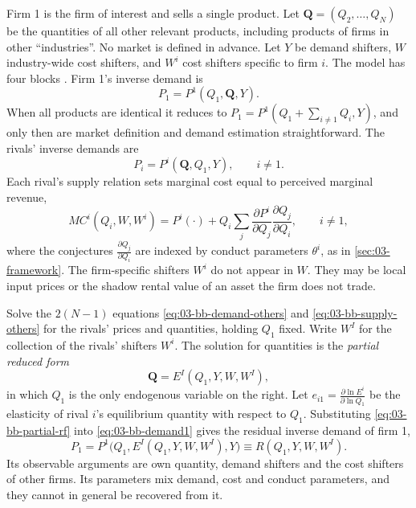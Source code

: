 Firm 1 is the firm of interest and sells a single product. Let $\mathbf{Q} = (Q_2, \dots, Q_N)$ be the
quantities of all other relevant products, including products of firms in other ``industries''. No market
is defined in advance. Let $Y$ be demand shifters, $W$ industry-wide cost shifters, and $W^i$ cost shifters
specific to firm $i$. The model has four blocks \citep[pp.~286--289]{BakerBresnahan1988}. Firm 1's inverse
demand is
\begin{equation}\label{eq:03-bb-demand1}
  P_1 = P^1(Q_1, \mathbf{Q}, Y).
\end{equation}
When all products are identical it reduces to $P_1 = P^1(Q_1 + \sum_{i \neq 1} Q_i, Y)$, and only then are
market definition and demand estimation straightforward. The rivals' inverse demands are
\begin{equation}\label{eq:03-bb-demand-others}
  P_i = P^i(\mathbf{Q}, Q_1, Y), \qquad i \neq 1 .
\end{equation}
Each rival's supply relation sets marginal cost equal to perceived marginal revenue,
\begin{equation}\label{eq:03-bb-supply-others}
  MC^i(Q_i, W, W^i) = P^i(\cdot) + Q_i \sum_j \frac{\partial P^i}{\partial Q_j}\frac{\partial Q_j}{\partial
  Q_i}, \qquad i \neq 1,
\end{equation}
where the conjectures $\frac{\partial Q_j}{\partial Q_i}$ are indexed by conduct parameters $\theta^i$, as in
\cref{sec:03-framework}. The firm-specific shifters $W^i$ do not appear in $W$. They may be local input prices
or the shadow rental value of an asset the firm does not trade.

Solve the $2(N - 1)$ equations \eqref{eq:03-bb-demand-others} and \eqref{eq:03-bb-supply-others} for the
rivals' prices and quantities, holding $Q_1$ fixed. Write $W^I$ for the collection of the rivals' shifters
$W^i$. The solution for quantities is the \emph{partial reduced form}
\begin{equation}\label{eq:03-bb-partial-rf}
  \mathbf{Q} = E^I(Q_1, Y, W, W^I),
\end{equation}
in which $Q_1$ is the only endogenous variable on the right. Let $e_{i1} = \frac{\partial \ln E^i}{\partial
\ln Q_1}$ be the elasticity of rival $i$'s equilibrium quantity with respect to $Q_1$. Substituting
\eqref{eq:03-bb-partial-rf} into \eqref{eq:03-bb-demand1} gives the residual inverse demand of firm 1,
\begin{equation}\label{eq:03-residual-demand}
  P_1 = P^1\bigl(Q_1, E^I(Q_1, Y, W, W^I), Y\bigr) \equiv R(Q_1, Y, W, W^I).
\end{equation}
Its observable arguments are own quantity, demand shifters and the cost shifters of other firms. Its
parameters mix demand, cost and conduct parameters, and they cannot in general be recovered from it.

